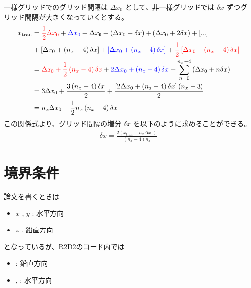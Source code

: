 \documentclass[letterpaper,10pt,dvipdfmx,report]{sphinxmanual}
\begin{document}
一様グリッドでのグリッド間隔は \(\Delta x_0\) として、非一様グリッドでは \(\delta x\) ずつグリッド間隔が大きくなっていくとする。
\begin{equation*}
\begin{split}x_\mathrm{tran}&={\color{red} \frac{1}{2} \Delta x_0} + {\color{blue} \Delta x_0} + \Delta x_0
+ \left(\Delta x_0 + \delta x\right)
+ \left(\Delta x_0 + 2\delta x\right) + [...] \\
&+ \left[\Delta x_0 + \left(n_x - 4\right)\delta x\right]
+ {\color{blue}\left[\Delta x_0 + \left(n_x - 4\right)\delta x\right]}
+ {\color{red}\frac{1}{2}\left[\Delta x_0 + \left(n_x - 4\right)\delta x\right]} \\
&= {\color{red} \Delta x_0 + \frac{1}{2}\left(n_x-4\right)\delta x}
+{\color{blue} 2\Delta x_0 + \left(n_x - 4\right)\delta x}
+ \sum_{n=0}^{n_x - 4}\left(\Delta x_0 + n\delta x\right) \\
&= 3\Delta x_0 + \frac{3\left(n_x-4\right)\delta x}{2}
+ \frac{\left[2\Delta x_0 + \left(n_x-4\right)\delta x\right]\left(n_x - 3\right)}{2} \\
&= n_x \Delta x_0 + \frac{1}{2} n_x\left(n_x - 4\right)\delta x\end{split}
\end{equation*}
この関係式より、グリッド間隔の増分 \(\delta x\) を以下のように求めることができる。
\begin{equation*}
\begin{split}\delta x = \frac{2\left(x_\mathrm{tran} - n_x\Delta x_0\right)}{\left(n_x - 4\right)n_x}\end{split}
\end{equation*}

\chapter{境界条件}
\label{\detokenize{boundary:id1}}\label{\detokenize{boundary::doc}}
論文を書くときは
\begin{itemize}
\item {} 
\(x\) , \(y\) : 水平方向

\item {} 
\(z\) : 鉛直方向

\end{itemize}

となっているが、R2D2のコード内では
\begin{itemize}
\item {} 
: 鉛直方向

\item {} 
, : 水平方向

\end{itemize}
\end{document}
